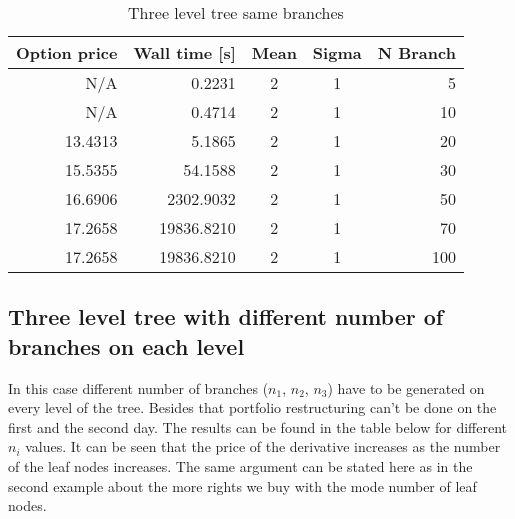 \documentclass[11pt]{article}
\begin{document}
\begin{table}[h!]
  \begin{center}
    \begin{tabular}{rrccr}
      \textbf{Option price} & \textbf{Wall time [s]} & \textbf{Mean} & \textbf{Sigma} & \textbf{N Branch} \\
      \hline
      N/A       & 0.2231           & 2    &     1 & 5  \\
      N/A       & 0.4714           & 2    &     1 & 10 \\
      13.4313   & 5.1865           & 2    &     1 & 20 \\
      15.5355   & 54.1588          & 2    &     1 & 30 \\
      16.6906   & 2302.9032        & 2    &     1 & 50 \\
      17.2658   & 19836.8210       & 2    &     1 & 70 \\
      17.2658   & 19836.8210       & 2    &     1 & 100 \\
     \end{tabular}
    \caption{Three level tree same branches}
  \end{center}
\end{table}

\subsection{Three level tree with different number of branches on each level}
In this case different number of branches ($n_1$, $n_2$, $n_3$) have to be generated on every level of the tree. Besides that portfolio restructuring can't be done on the first and the second day. The results can be found in the table below for different $n_i$ values. It can be seen that the price of the derivative increases as the number of the leaf nodes increases. The same argument can be stated here as in the second example about the more rights we buy with the mode number of leaf nodes.
\end{document}
